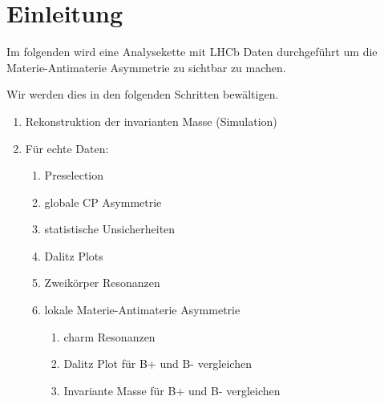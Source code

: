 \section{Einleitung}
\label{sec:einleitung}
Im folgenden wird eine Analysekette mit LHCb Daten durchgef\"uhrt um die Materie-Antimaterie Asymmetrie zu sichtbar zu machen.

Wir werden dies in den folgenden Schritten bew\"altigen.
\begin{enumerate}
  \item Rekonstruktion der invarianten Masse (Simulation)
  \item F\"ur echte Daten:
  \begin{enumerate}
    \item Preselection
    \item globale CP Asymmetrie
    \item statistische Unsicherheiten
    \item Dalitz Plots
    \item Zweik\"orper Resonanzen
    \item lokale Materie-Antimaterie Asymmetrie
    \begin{enumerate}
      \item charm Resonanzen
      \item Dalitz Plot f\"ur B+ und B- vergleichen
      \item Invariante Masse f\"ur B+ und B- vergleichen
    \end{enumerate}
  \end{enumerate}
\end{enumerate}
